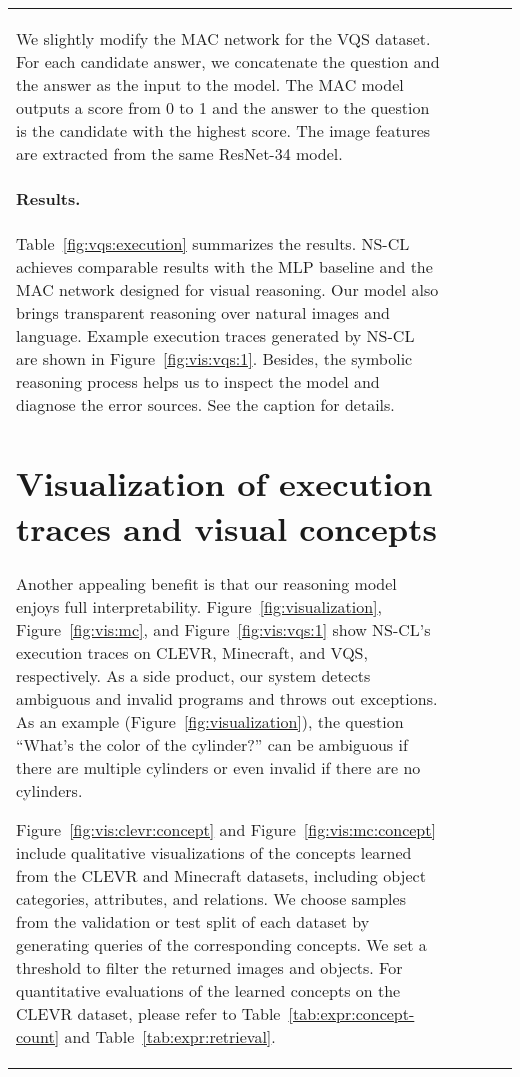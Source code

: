 \documentclass{article} \usepackage{iclr2019_conference,times}
\newcommand{\model}{NS-CL\xspace}
\begin{document}
\begin{figure*}[t]
\begin{minipage}{0.48\textwidth}
\begin{tabular}{lcccc}
{We slightly modify the MAC network for the VQS dataset. For each candidate answer, we concatenate the question and the answer as the input to the model. The MAC model outputs a score from 0 to 1 and the answer to the question is the candidate with the highest score. The image features are extracted from the same ResNet-34 model.

\paragraph{Results. }
Table~\ref{fig:vqs:execution} summarizes the results. \model achieves comparable results with the MLP baseline and the MAC network designed for visual reasoning. Our model also brings transparent reasoning over natural images and language. Example execution traces generated by \model are shown in Figure~\ref{fig:vis:vqs:1}. Besides, the symbolic reasoning process helps us to inspect the model and diagnose the error sources. See the caption for details. 

\section{Visualization of execution traces and visual concepts}
\label{sec:app:concept}

Another appealing benefit is that our reasoning model enjoys full interpretability. Figure~\ref{fig:visualization}, Figure~\ref{fig:vis:mc}, and Figure~\ref{fig:vis:vqs:1} show \model's execution traces on CLEVR, Minecraft, and VQS, respectively. As a side product, our system detects ambiguous and invalid programs and throws out exceptions. As an example (Figure~\ref{fig:visualization}), the question ``What's the color of the cylinder?'' can be ambiguous if there are multiple cylinders or even invalid if there are no cylinders.

Figure~\ref{fig:vis:clevr:concept} and Figure~\ref{fig:vis:mc:concept} include qualitative visualizations of the concepts learned from the CLEVR and Minecraft datasets, including object categories, attributes, and relations. We choose samples from the validation or test split of each dataset by generating queries of the corresponding concepts. We set a threshold to filter the returned images and objects. For quantitative evaluations of the learned concepts on the CLEVR dataset, please refer to Table~\ref{tab:expr:concept-count} and Table~\ref{tab:expr:retrieval}.

}
\end{tabular}
\end{minipage}
\end{figure*}
\end{document}
